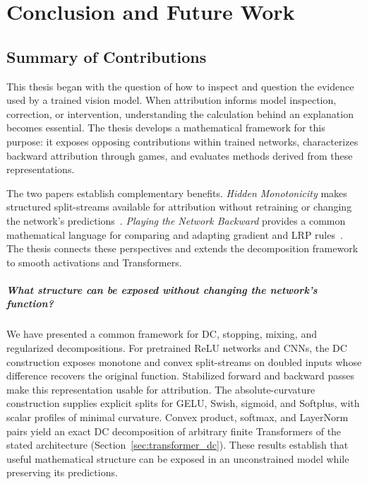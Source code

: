 \chapter{Conclusion and Future Work}\label{ch:conclusion}

\section{Summary of Contributions}\label{sec:summary_contributions}

This thesis began with the question of how to inspect and question the evidence used by a trained vision model. When attribution informs model inspection, correction, or intervention, understanding the calculation behind an explanation becomes essential. The thesis develops a mathematical framework for this purpose: it exposes opposing contributions within trained networks, characterizes backward attribution through games, and evaluates methods derived from these representations.

The two papers establish complementary benefits. \emph{Hidden Monotonicity} makes structured split-streams available for attribution without retraining or changing the network's predictions~\parencite{hiddenMono}. \emph{Playing the Network Backward} provides a common mathematical language for comparing and adapting gradient and LRP rules~\parencite{playingBackward2026}. The thesis connects these perspectives and extends the decomposition framework to smooth activations and Transformers.

\paragraph{What structure can be exposed without changing the network's function?}
We have presented a common framework for DC, stopping, mixing, and regularized decompositions. For pretrained ReLU networks and CNNs, the DC construction exposes monotone and convex split-streams on doubled inputs whose difference recovers the original function. Stabilized forward and backward passes make this representation usable for attribution. The absolute-curvature construction supplies explicit splits for GELU, Swish, sigmoid, and Softplus, with scalar profiles of minimal curvature. Convex product, softmax, and LayerNorm pairs yield an exact DC decomposition of arbitrary finite Transformers of the stated architecture (Section~\ref{sec:transformer_dc}). These results establish that useful mathematical structure can be exposed in an unconstrained model while preserving its predictions.

